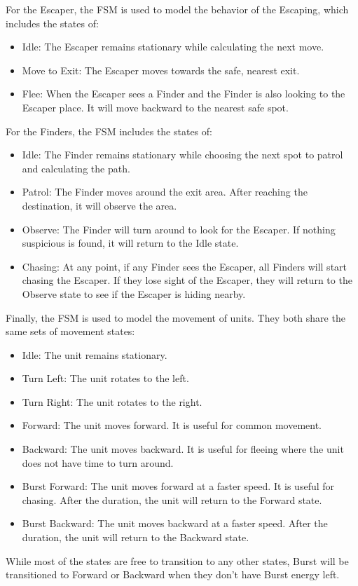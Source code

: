 \documentclass[a4paper,12pt]{article}
\begin{document}
For the Escaper, the FSM is used to model the behavior of the Escaping, which includes the states of:
\begin{itemize}
    \item Idle: The Escaper remains stationary while calculating the next move.
    \item Move to Exit: The Escaper moves towards the safe, nearest exit.
    \item Flee: When the Escaper sees a Finder and the Finder is also looking to the Escaper place.
        It will move backward to the nearest safe spot.
\end{itemize}

For the Finders, the FSM includes the states of:
\begin{itemize}
    \item Idle: The Finder remains stationary while choosing the next spot to patrol and calculating the path.
    \item Patrol: The Finder moves around the exit area.
        After reaching the destination, it will observe the area.
    \item Observe: The Finder will turn around to look for the Escaper.
        If nothing suspicious is found, it will return to the Idle state.
    \item Chasing: At any point, if any Finder sees the Escaper, all Finders will start chasing the Escaper.
        If they lose sight of the Escaper, they will return to the Observe state to see if the Escaper is hiding nearby.
\end{itemize}

Finally, the FSM is used to model the movement of units.
They both share the same sets of movement states:
\begin{itemize}
    \item Idle: The unit remains stationary.
    \item Turn Left: The unit rotates to the left.
    \item Turn Right: The unit rotates to the right.
    \item Forward: The unit moves forward. It is useful for common movement.
    \item Backward: The unit moves backward. It is useful for fleeing where the unit does not have time to turn around.
    \item Burst Forward: The unit moves forward at a faster speed. It is useful for chasing. After the duration, the unit will return to the Forward state.
    \item Burst Backward: The unit moves backward at a faster speed. After the duration, the unit will return to the Backward state.
\end{itemize}
While most of the states are free to transition to any other states, Burst will be transitioned to Forward or Backward when they don't have Burst energy left.
\end{document}
